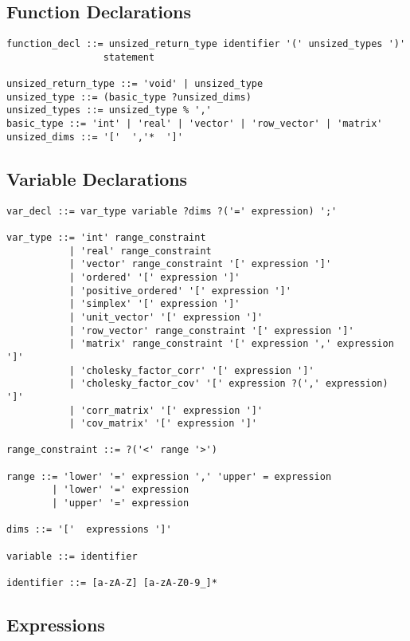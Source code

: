 \subsection{Function Declarations}

{
\small
\begin{Verbatim}[fontsize=\small]
function_decl ::= unsized_return_type identifier '(' unsized_types ')'
                 statement

unsized_return_type ::= 'void' | unsized_type
unsized_type ::= (basic_type ?unsized_dims)
unsized_types ::= unsized_type % ','
basic_type ::= 'int' | 'real' | 'vector' | 'row_vector' | 'matrix'
unsized_dims ::= '['  ','*  ']'
\end{Verbatim}
}

\subsection{Variable Declarations}

{
\small
\begin{Verbatim}[fontsize=\small]
var_decl ::= var_type variable ?dims ?('=' expression) ';'

var_type ::= 'int' range_constraint
           | 'real' range_constraint
           | 'vector' range_constraint '[' expression ']'
           | 'ordered' '[' expression ']'
           | 'positive_ordered' '[' expression ']'
           | 'simplex' '[' expression ']'
           | 'unit_vector' '[' expression ']'
           | 'row_vector' range_constraint '[' expression ']'
           | 'matrix' range_constraint '[' expression ',' expression ']'
           | 'cholesky_factor_corr' '[' expression ']'
           | 'cholesky_factor_cov' '[' expression ?(',' expression) ']'
           | 'corr_matrix' '[' expression ']'
           | 'cov_matrix' '[' expression ']'

range_constraint ::= ?('<' range '>')

range ::= 'lower' '=' expression ',' 'upper' = expression
        | 'lower' '=' expression
        | 'upper' '=' expression

dims ::= '['  expressions ']'

variable ::= identifier

identifier ::= [a-zA-Z] [a-zA-Z0-9_]*
\end{Verbatim}
}

\subsection{Expressions}


